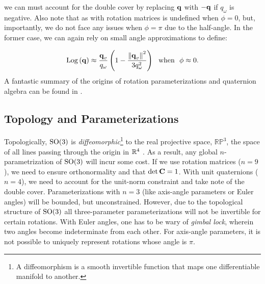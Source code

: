 \noindent we can must account for the double cover by replacing $\boldsymbol{\mathbf{q}}$ with $-\boldsymbol{\mathbf{q}}$ if $q_\omega$ is negative. Also note that as with rotation matrices  is undefined when $\phi = 0$, but, importantly, we do not face any issues when $\phi = \pi$ due to the half-angle. In the former case, we can again rely on small angle approximations to define:

\begin{equation}
	\mathrm{Log}\left({\boldsymbol{\mathbf{q}}}\right) \approx \frac{\boldsymbol{\mathbf{q}}_v}{q_\omega} \left( 1 - \frac{\left\Vert\boldsymbol{\mathbf{q}}_v\right\Vert^2}{3 q_\omega^2}\right) ~~ \textrm{when} ~~ \phi \approx 0. 
\end{equation}
A fantastic summary of the origins of rotation parameterizations and quaternion algebra can be found in \cite{Altmann1989-ru}.

\subsection{Topology and Parameterizations}
Topologically, $\mathrm{SO}(3)$ is \textit{diffeomorphic}\footnote{A diffeomorphism is a smooth invertible function that maps one differentiable manifold to another.} to the real projective space, $\mathbb{RP}^3$, the space of all lines passing through the origin in $\RealNumbers^4$ \citep{Hartley2013-rc}. As a result, any global $n$-parametrization of $\mathrm{SO}(3)$ will incur some cost. If we use rotation matrices ($n = 9$), we need to ensure orthonormality and that $\det \boldsymbol{\mathbf{C}} = 1$. With unit quaternions ($n = 4$), we need to account for the unit-norm constraint and take note of the double cover. Parameterizations with $n=3$ (like axis-angle parameters or Euler angles) will be bounded, but unconstrained. However, due to the topological structure of $\mathrm{SO}(3)$ all three-parameter parameterizations will not be invertible for certain rotations. With Euler angles, one has to be wary of \textit{gimbal lock}, wherein two angles become indeterminate from each other. For axis-angle parameters, it is not possible to uniquely represent rotations whose angle is $\pi$. 
 
